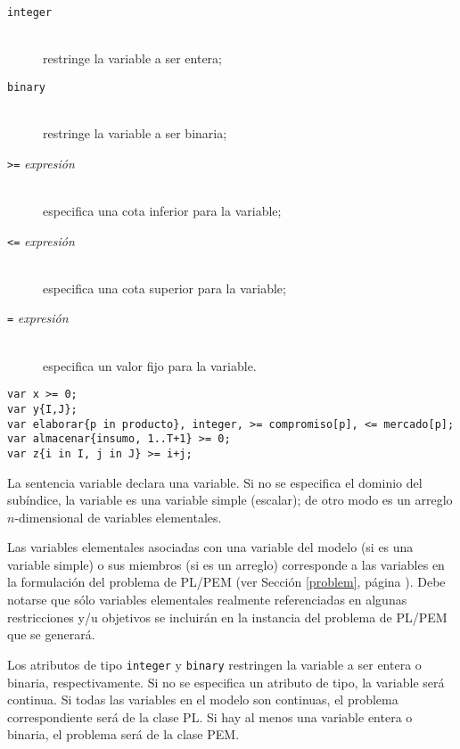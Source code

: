 \documentclass[11pt,spanish]{report}
\def\para#1{\noindent{\bf#1}}
\begin{document}
\para{Atributos opcionales}

\vspace*{-8pt}

\begin{description}
\item[{\tt integer}]\hspace*{0pt}\\
restringe la variable a ser entera;
\item[{\tt binary}]\hspace*{0pt}\\
restringe la variable a ser binaria;
\item[{\tt>=} {\it expresión}]\hspace*{0pt}\\
especifica una cota inferior para la variable;
\item[{\tt<=} {\it expresión}]\hspace*{0pt}\\
especifica una cota superior para la variable;
\item[{\tt=} {\it expresión}]\hspace*{0pt}\\
especifica un valor fijo para la variable.
\end{description}

\vspace*{-8pt}

\para{Ejemplos}

\begin{verbatim}
var x >= 0;
var y{I,J};
var elaborar{p in producto}, integer, >= compromiso[p], <= mercado[p];
var almacenar{insumo, 1..T+1} >= 0;
var z{i in I, j in J} >= i+j;
\end{verbatim}

La sentencia variable declara una variable. Si no se especifica el dominio del subíndice, la variable es una variable simple (escalar); de otro modo es un arreglo $n$-dimensional de variables elementales.

Las variables elementales asociadas con una variable del modelo (si es una variable simple) o sus miembros (si es un arreglo) corresponde a las variables en la formulación del problema de PL/PEM (ver Sección \ref{problem}, página \pageref{problem}). Debe notarse que sólo variables elementales realmente referenciadas en algunas restricciones y/u objetivos se incluirán en la instancia del problema de PL/PEM que se generará.

Los atributos de tipo {\tt integer} y {\tt binary} restringen la variable a ser entera o binaria, respectivamente. Si no se especifica un atributo de tipo, la variable será continua. Si todas las variables en el modelo son continuas, el problema correspondiente será de la clase PL. Si hay al menos una variable entera o binaria, el problema será de la clase PEM.
\end{document}
